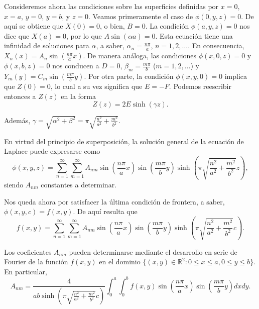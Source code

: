\documentclass[12pt,a4paper]{book}
\begin{document}
Consideremos ahora las condiciones sobre las superficies definidas por $x = 0$, $x = a$, $y = 0$, $y = b$, y $z = 0$. Veamos primeramente el caso de $\phi(0, y, z) = 0$. De aquí se obtiene que $X(0) = 0$, o bien, $B = 0$. La condición $\phi(a, y, z) = 0$ nos dice que $X(a) = 0$, por lo que $A\sin(\alpha a) = 0$. Esta ecuación tiene una infinidad de soluciones para $\alpha$, a saber, $\alpha_n = \frac{n\pi}{a}$, $n = 1, 2, \ldots$. En consecuencia, $X_n(x) = A_n\sin\left(\frac{n\pi}{a}x\right)$. De manera análoga, las condiciones $\phi(x, 0, z) = 0$ y $\phi(x, b, z) = 0$ nos conducen a $D = 0$, $\beta_m = \frac{m\pi}{b}$ ($m = 1, 2, \ldots$) y $Y_m(y) = C_m\sin\left(\frac{m\pi}{b}y\right)$. Por otra parte, la condición $\phi(x, y, 0) = 0$ implica que $Z(0) = 0$, lo cual a su vez significa que $E = -F$. Podemos reescribir entonces a $Z(z)$ en la forma
\begin{equation}
Z(z) = 2E\sinh(\gamma z).
\end{equation}

Además, $\gamma = \sqrt{\alpha^2 + \beta^2} = \pi\sqrt{\frac{n^2}{a^2} + \frac{m^2}{b^2}}$.

En virtud del principio de superposición, la solución general de la ecuación de Laplace puede expresarse como
\begin{equation}
\phi(x, y, z) = \sum_{n=1}^{\infty}\sum_{m=1}^{\infty}A_{nm}\sin\left(\frac{n\pi}{a}x\right)\sin\left(\frac{m\pi}{b}y\right)\sinh\left(\pi\sqrt{\frac{n^2}{a^2} + \frac{m^2}{b^2}}z\right),
\end{equation}
siendo $A_{nm}$ constantes a determinar.

Nos queda ahora por satisfacer la última condición de frontera, a saber, $\phi(x, y, c) = f(x, y)$. De aquí resulta que
\begin{equation}
f(x, y) = \sum_{n=1}^{\infty}\sum_{m=1}^{\infty}A_{nm}\sin\left(\frac{n\pi}{a}x\right)\sin\left(\frac{m\pi}{b}y\right)\sinh\left(\pi\sqrt{\frac{n^2}{a^2} + \frac{m^2}{b^2}}c\right).
\end{equation}

Los coeficientes $A_{nm}$ pueden determinarse mediante el desarrollo en serie de Fourier de la función $f(x, y)$ en el dominio $\{(x, y) \in \mathbb{R}^2 : 0 \leq x \leq a, 0 \leq y \leq b\}$. En particular,
\begin{equation}
A_{nm} = \frac{4}{ab\sinh\left(\pi\sqrt{\frac{n^2}{a^2} + \frac{m^2}{b^2}}c\right)}\int_{0}^{a}\int_{0}^{b}f(x, y)\sin\left(\frac{n\pi}{a}x\right)\sin\left(\frac{m\pi}{b}y\right)dxdy.
\end{equation}
\end{document}

